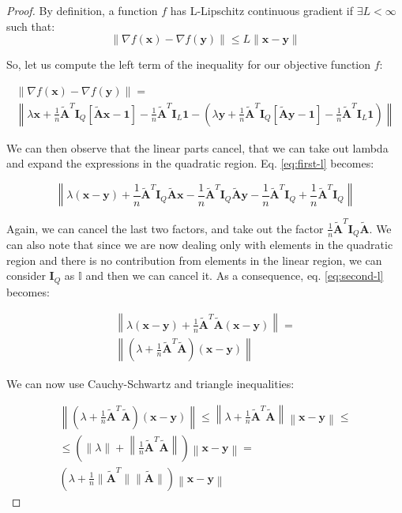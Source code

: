 \documentclass[12pt]{article}
\newcommand{\xb}{\mathbf{x}}
\newcommand{\yb}{\mathbf{y}}
\newcommand{\atilde}{\mathbf{\tilde{A}}}
\newcommand{\id}{\mathbf{I}}
\newcommand{\ones}{\mathbf{1}}
\begin{document}
\begin{proof}
By definition, a function $f$ has L-Lipschitz continuous gradient if $\exists L < \infty$ such that:
\begin{equation} \label{eq:l-smooth}
    \lVert \nabla f(\xb) - \nabla f(\yb) \rVert \leq L \lVert \xb - \yb \rVert
\end{equation}

So, let us compute the left term of the inequality for our objective function $f$:

\begin{gather}
    \lVert \nabla f(\xb) - \nabla f(\yb) \rVert = \nonumber \\
    \left \lVert \lambda\xb + \frac{1}{n}\atilde^T\id_Q[\atilde \xb - \ones] - \frac{1}{n}\atilde^T\id_L\ones - \left ( \lambda\yb + \frac{1}{n}\atilde^T\id_Q[\atilde \yb - \ones] - \frac{1}{n}\atilde^T\id_L\ones \right ) \right \rVert \label{eq:first-l}
\end{gather}

We can then observe that the linear parts cancel, that we can take out lambda and expand the expressions in the quadratic region. Eq. \ref{eq:first-l} becomes:

\begin{equation} \label{eq:second-l}
        \left \lVert \lambda (\xb - \yb) + \frac{1}{n}\atilde^T\id_Q\atilde\xb - \frac{1}{n}\atilde^T\id_Q\atilde\yb - \frac{1}{n}\atilde^T\id_Q + \frac{1}{n}\atilde^T\id_Q \right\rVert 
\end{equation}

Again, we can cancel the last two factors, and take out the factor $\frac{1}{n}\atilde^T\id_Q\atilde$. We can also note that since we are now dealing only with elements in the quadratic region and there is no contribution from elements in the linear region, we can consider $\id_Q$ as $\mathbb{I}$ and then we can cancel it. As a consequence, eq. \ref{eq:second-l} becomes:

\begin{gather}
    \left \lVert \lambda(\xb - \yb) + \frac{1}{n}\atilde^T\atilde (\xb - \yb) \right \rVert = \nonumber \\
    \left \lVert \left ( \lambda + \frac{1}{n}\atilde^T\atilde \right ) (\xb - \yb) \right \rVert \label{eq:third-l}
\end{gather}

We can now use Cauchy-Schwartz and triangle inequalities:

\begin{gather}
    \left \lVert \left ( \lambda + \frac{1}{n}\atilde^T\atilde \right ) (\xb - \yb) \right \rVert \leq
    \left \lVert \lambda + \frac{1}{n}\atilde^T\atilde \right \rVert \left \lVert \xb - \yb \right \rVert \leq \nonumber \\
    \leq \left ( \lVert \lambda \rVert + \left \lVert \frac{1}{n}\atilde^T\atilde \right \rVert \right ) \left \lVert \xb - \yb \right \rVert = \nonumber \\
    \left (\lambda + \frac{1}{n} \lVert \atilde^T \rVert \lVert \atilde \rVert  \right ) \left \lVert \xb - \yb \right \rVert \label{eq:fourth-l}
\end{gather}


\end{proof}
\end{document}

